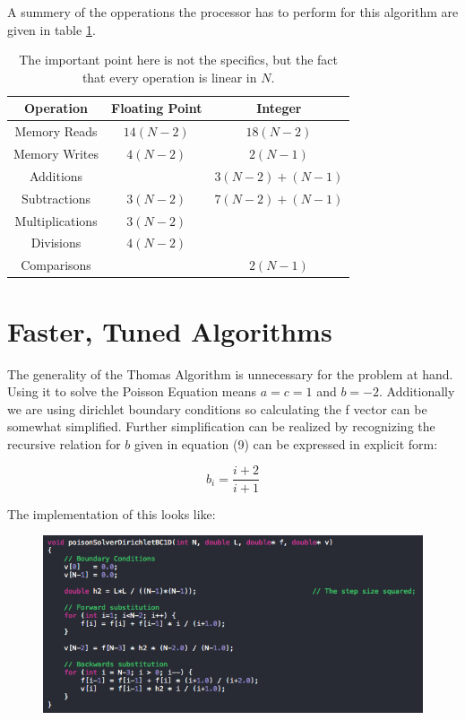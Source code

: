 \documentclass[twocolumn, groupedaddress]{revtex4-1}
\begin{document}
A summery of the opperations the processor has to perform for this algorithm are given in table \ref{table:thomasAlgoFLOPS}.

\begin{table}[t]
	\centering
	\begin{tabular}{ c | c | c }
		Operation	    & Floating Point & Integer          \\
		\hline
		Memory Reads    &    $14(N-2)$   & $18(N-2)$        \\
		\hline
		Memory Writes   &     $4(N-2)$   & $2(N-1)$         \\
		\hline
		Additions       &                & $3(N-2) + (N-1)$ \\
		\hline
		Subtractions    &     $3(N-2)$   & $7(N-2) + (N-1)$ \\
		\hline
		Multiplications &     $3(N-2)$   &                  \\
		\hline
		Divisions       &     $4(N-2)$   &		           \\
		\hline
		Comparisons	    &                & $2(N-1)$         \\
	\end{tabular}
	\caption{The important point here is not the specifics, but the fact that every operation is linear in $N$. \label{table:thomasAlgoFLOPS}}
\end{table}

\section{Faster, Tuned Algorithms}
The generality of the Thomas Algorithm is unnecessary for the problem at hand.  Using it to solve the Poisson Equation means $a=c=1$ and $b=-2$.  Additionally we are using dirichlet boundary conditions so calculating the f vector can be somewhat simplified.  Further simplification can be realized by recognizing the recursive relation for $b$ given in equation (9) can be expressed in explicit form:

\begin{equation}
b_i = \frac{i+2}{i+1}
\end{equation}

The implementation of this looks like:

\begin{figure}
	\centering
	\includegraphics[width = 0.8\linewidth]{cppPoissonSolverFast.png}
	\caption{}
\end{figure}
\end{document}
